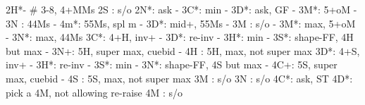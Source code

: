 2H*- # 3-8, 4+MMs
2S : s/o
2N*: ask
   - 3C*: min
		- 3D*: ask, GF
			 - 3M*: 5+oM
			 - 3N : 44Ms
			 - 4m*: 55Ms, spl m
   - 3D*: mid+, 55Ms
		- 3M : s/o
   - 3M*: max, 5+oM
   - 3N*: max, 44Ms
3C*: 4+H, inv+
   - 3D*: re-inv
   - 3H*: min
   - 3S*: shape-FF, 4H but max
   - 3N+: 5H, super max, cuebid
   - 4H : 5H, max, not super max
3D*: 4+S, inv+
   - 3H*: re-inv
   - 3S*: min
   - 3N*: shape-FF, 4S but max
   - 4C+: 5S, super max, cuebid
   - 4S : 5S, max, not super max
3M : s/o
3N : s/o
4C*: ask, ST
4D*: pick a 4M, not allowing re-raise
4M : s/o
